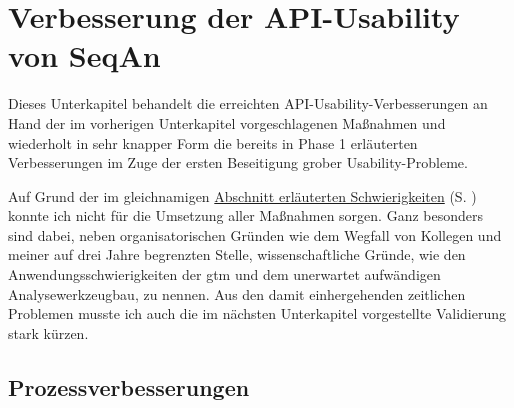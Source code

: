 \section{Verbesserung der API-Usability von SeqAn}
\label{sec:seqan-api-usability-verbesserung}

Dieses Unterkapitel behandelt die erreichten API-Usability-Verbesserungen an Hand der im vorherigen Unterkapitel vorgeschlagenen Maßnahmen und wiederholt in sehr knapper Form die bereits in Phase 1 erläuterten Verbesserungen im Zuge der ersten Beseitigung grober Usability-Probleme.

Auf Grund der im gleichnamigen \hyperref[sec:schwierigkeiten]{Abschnitt erläuterten Schwierigkeiten} (S. \pageref{sec:schwierigkeiten}) konnte ich nicht für die Umsetzung aller Maßnahmen sorgen. Ganz besonders sind dabei, neben organisatorischen Gründen wie dem Wegfall von Kollegen und meiner auf drei Jahre begrenzten Stelle, wissenschaftliche Gründe, wie den Anwendungsschwierigkeiten der \gls{gtm} und dem unerwartet aufwändigen Analysewerkzeugbau, zu nennen. Aus den damit einhergehenden zeitlichen Problemen musste ich auch die im nächsten Unterkapitel vorgestellte Validierung stark kürzen.

\subsection{Prozessverbesserungen}

